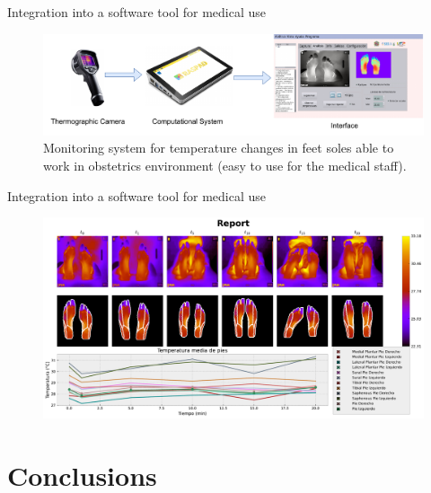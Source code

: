 \documentclass[aspectratio=169]{beamer}
\begin{document}
\begin{frame}{Integration into a software tool for medical use}
\begin{figure}
        \centering
        \includegraphics[width=0.98\linewidth]{Figures/system.pdf}
        \caption{Monitoring system for temperature changes in feet soles able to work in obstetrics environment (easy to use for the medical staff).}
\end{figure}
    
\end{frame}



\begin{frame}{Integration into a software tool for medical use}
\begin{figure}
        \centering
        \includegraphics[width=0.87\linewidth]{Figures/report.pdf}
\end{figure}
    
\end{frame}



\section{Conclusions}
\end{document}
